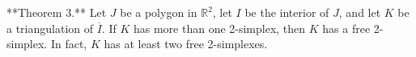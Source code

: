 **Theorem 3.** Let $J$ be a polygon in $\mathbb{R}^2$, let $I$ be the interior of $J$, and let $K$ be a triangulation of $\overline{I}$. If $K$ has more than one 2-simplex, then $K$ has a free 2-simplex. In fact, $K$ has at least two free 2-simplexes.
